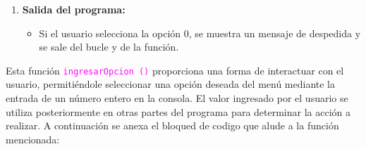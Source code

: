 \documentclass{article}
\begin{document}
\begin{enumerate}
                    \item \textbf{Salida del programa:}
                    \begin{itemize}
                        \item Si el usuario selecciona la opción 0, se muestra un mensaje de despedida y se sale del bucle y de la función.
                    \end{itemize}
                \end{enumerate}

                Esta función \textcolor{magenta}{\texttt{ingresarOpcion ()}} proporciona una forma de interactuar con el usuario, permitiéndole seleccionar una
                opción deseada del menú mediante la entrada de un número entero en la consola. El valor ingresado por el usuario se utiliza
                posteriormente en otras partes del programa para determinar la acción a realizar. A continuación se anexa el bloqued de codigo
                que alude a la función mencionada:
\end{document}
